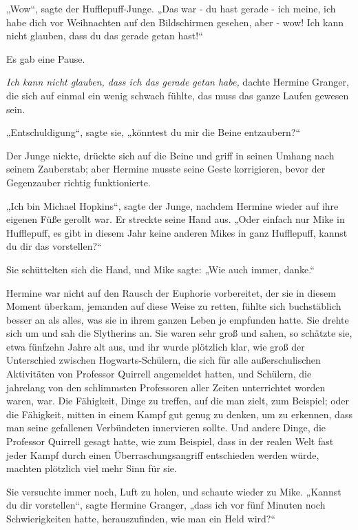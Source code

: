 {„Wow“, sagte der Hufflepuff-Junge. „Das war - du hast gerade - ich meine, ich habe dich vor Weihnachten auf den Bildschirmen gesehen, aber - wow! Ich kann nicht glauben, dass du das gerade getan hast!“

Es gab eine Pause.

\emph{Ich kann nicht glauben, dass ich das gerade getan habe,} dachte Hermine Granger, die sich auf einmal ein wenig schwach fühlte, das muss das ganze Laufen gewesen sein.

„Entschuldigung“, sagte sie, „könntest du mir die Beine entzaubern?“

Der Junge nickte, drückte sich auf die Beine und griff in seinen Umhang nach seinem Zauberstab; aber Hermine musste seine Geste korrigieren, bevor der Gegenzauber richtig funktionierte.

„Ich bin Michael Hopkins“, sagte der Junge, nachdem Hermine wieder auf ihre eigenen Füße gerollt war. Er streckte seine Hand aus. „Oder einfach nur Mike in Hufflepuff, es gibt in diesem Jahr keine anderen Mikes in ganz Hufflepuff, kannst du dir das vorstellen?“

Sie schüttelten sich die Hand, und Mike sagte: „Wie auch immer, danke.“

Hermine war nicht auf den Rausch der Euphorie vorbereitet, der sie in diesem Moment überkam, jemanden auf diese Weise zu retten, fühlte sich buchstäblich besser an als alles, was sie in ihrem ganzen Leben je empfunden hatte. Sie drehte sich um und sah die Slytherins an. Sie waren sehr groß und sahen, so schätzte sie, etwa fünfzehn Jahre alt aus, und ihr wurde plötzlich klar, wie groß der Unterschied zwischen Hogwarts-Schülern, die sich für alle außerschulischen Aktivitäten von Professor Quirrell angemeldet hatten, und Schülern, die jahrelang von den schlimmsten Professoren aller Zeiten unterrichtet worden waren, war. Die Fähigkeit, Dinge zu treffen, auf die man zielt, zum Beispiel; oder die Fähigkeit, mitten in einem Kampf gut genug zu denken, um zu erkennen, dass man seine gefallenen Verbündeten innervieren sollte. Und andere Dinge, die Professor Quirrell gesagt hatte, wie zum Beispiel, dass in der realen Welt fast jeder Kampf durch einen Überraschungsangriff entschieden werden würde, machten plötzlich viel mehr Sinn für sie.

Sie versuchte immer noch, Luft zu holen, und schaute wieder zu Mike. „Kannst du dir vorstellen“, sagte Hermine Granger, „dass ich vor fünf Minuten noch Schwierigkeiten hatte, herauszufinden, wie man ein Held wird?“

}
